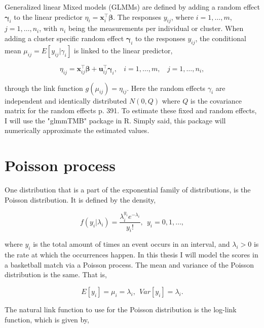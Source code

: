 \noindent Generalized linear Mixed models (GLMMs) are defined by adding a random effect $\boldsymbol{\gamma}_i$ to the linear predictor $\eta_i = \mathbf{x}_i^\top \boldsymbol{\beta}$. The responses $y_{ij}$, where $i = 1,\dots,m$, $j = 1, \dots, n_i$, with $n_i$ being the measurements per individual or cluster. When adding a cluster specific random effect $\boldsymbol{\gamma}_i$ to the responses $y_{ij}$, the conditional mean $\mu_{ij} = E[y_{ij}|\gamma_i]$ is linked to the linear predictor,

\begin{equation}
\eta_{ij} = \mathbf{x}_{ij}^\top \boldsymbol{\beta} + \mathbf{u}_{ij}^\top \boldsymbol{\gamma}_i, \ \ \ \ i = 1,\dots,m, \ \ \ \ j = 1, \dots, n_i,
\label{eqn:LinPredGLMM}
\end{equation}

\noindent through the link function $g(\mu_{ij}) = \eta_{ij}$. Here the random effects $\gamma_i$ are independent and identically distributed $N(0,Q)$ where $Q$ is the covariance matrix for the random effects \cite{regression} p. 391. To estimate these fixed and random effects, I will use the "glmmTMB" package in R. Simply said, this package will numerically approximate the estimated values.

\section{Poisson process}

\noindent One distribution that is a part of the exponential family of distributions, is the Poisson distribution. It is defined by the density,

\begin{equation}
f(y_i|\lambda_i) = \frac{\lambda_i^{y_i} e^{-\lambda_i}}{y_i!}, \ \ y_i = 0,1,\dots,
\label{eqn:expPDF}
\end{equation}

\noindent where $y_i$ is the total amount of times an event occurs in an interval, and $\lambda_i > 0$ is the rate at which the occurrences happen. In this thesis I will model the scores in a basketball match via a Poisson process. The mean and variance of the Poisson distribution is the same. That is,

\begin{equation*}
E[y_i] = \mu_i = \lambda_i, \ \ Var[y_i] = \lambda_i.
\label{eqn:expEV}
\end{equation*}

\noindent The natural link function to use for the Poisson distribution is the log-link function, which is given by,


